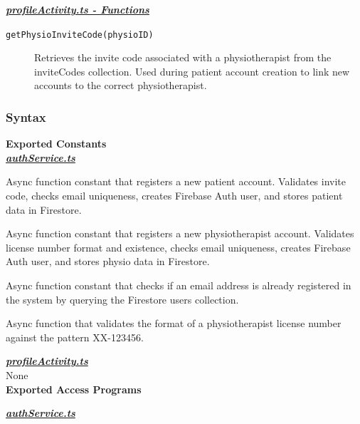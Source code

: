 \documentclass[12pt, titlepage]{article}
\begin{document}
\noindent \underline{\textbf{\textit{profileActivity.ts - Functions}}}
\begin{description}
\item[\texttt{getPhysioInviteCode(physioID)}] 
    Retrieves the invite code associated with a physiotherapist from the inviteCodes collection. Used during patient account creation to link new accounts to the correct physiotherapist.
\end{description}

\subsubsection{Syntax}

\textbf{Exported Constants}\\
\noindent \textbf{\textit{\underline{authService.ts}}}
\begin{description}[style=nextline, leftmargin=2.5cm]

\item[\texttt{export const registerPatient}] 
    Async function constant that registers a new patient account. Validates invite code, checks email uniqueness, creates Firebase Auth user, and stores patient data in Firestore.

\item[\texttt{export const registerPhysio}] 
    Async function constant that registers a new physiotherapist account. Validates license number format and existence, checks email uniqueness, creates Firebase Auth user, and stores physio data in Firestore.

\item[\texttt{export const checkEmailExists}] 
    Async function constant that checks if an email address is already registered in the system by querying the Firestore users collection.

\item[\texttt{export const licenseFormatValid}] 
    Async function that validates the format of a physiotherapist license number against the pattern XX-123456.

\end{description}

\noindent \underline{\textbf{\textit{profileActivity.ts}}} \\
None\\


\noindent \textbf{Exported Access Programs} 

\noindent \underline{\textbf{\textit{authService.ts}}} \\
\end{document}
